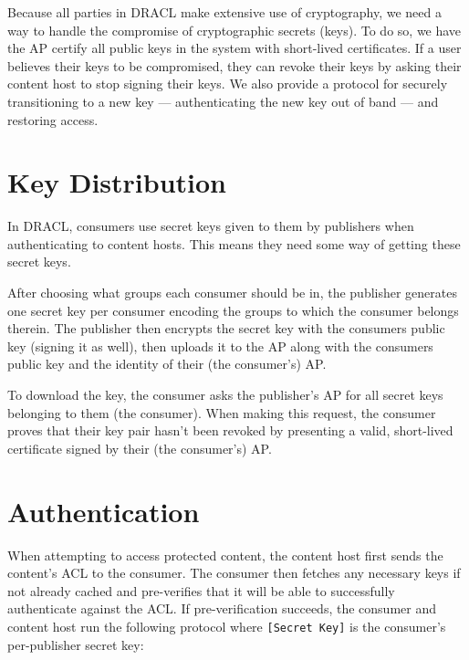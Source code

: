 \documentclass[pdftex,12pt,a4papaer]{report}
\begin{document}
Because all parties in DRACL make extensive use of cryptography, we need a way
to handle the compromise of cryptographic secrets (keys). To do so, we have the
AP certify all public keys in the system with short-lived certificates. If a
user believes their keys to be compromised, they can revoke their keys by asking
their content host to stop signing their keys. We also provide a protocol for
securely transitioning to a new key --- authenticating the new key out of band
--- and restoring access.

\section{Key Distribution}

In DRACL, consumers use secret keys given to them by publishers when
authenticating to content hosts. This means they need some way of getting these
secret keys.

After choosing what groups each consumer should be in, the publisher generates
one secret key per consumer encoding the groups to which the consumer belongs
therein. The publisher then encrypts the secret key with the consumers public
key (signing it as well), then uploads it to the AP along with the consumers
public key and the identity of their (the consumer's) AP.

To download the key, the consumer asks the publisher's AP for all secret keys
belonging to them (the consumer). When making this request, the consumer proves
that their key pair hasn't been revoked by presenting a valid, short-lived
certificate signed by their (the consumer's) AP.

\section{Authentication}
\label{sub:authentication}

When attempting to access protected content, the content host first sends the
content's ACL to the consumer. The consumer then fetches any necessary keys if
not already cached and pre-verifies that it will be able to successfully
authenticate against the ACL. If pre-verification succeeds, the consumer and
content host run the following protocol where \verb=[Secret Key]= is the
consumer's per-publisher secret key:
\end{document}
